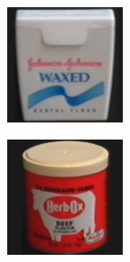 \begin{figure}[tbp]
\begin{subfigure}{80pt}
    \caption{}
	\end{subfigure}
	\begin{subfigure}{80pt}
        \centering
    \includegraphics[width=\textwidth]{figures/coil_original/65.png}
    \caption{}
	\end{subfigure}
	\begin{subfigure}{80pt}
        \centering
    \includegraphics[width=\textwidth]{figures/coil_original/71.png}

\end{subfigure}
\end{figure}

